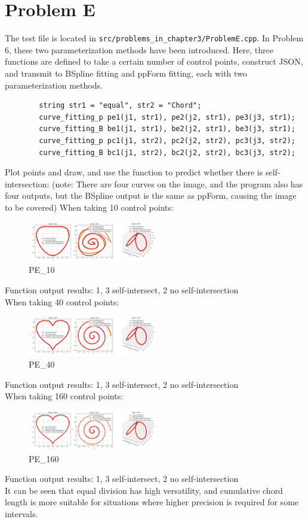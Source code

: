 \documentclass[a4paper]{article}
\begin{document}
\section*{Problem E}
    The test file is located in \texttt{src/problems\_in\_chapter3/ProblemE.cpp}.
    In Problem 6, these two parameterization methods have been introduced.
    Here, three functions are defined to take a certain number of control points, construct JSON, and transmit to BSpline fitting and ppForm fitting, each with two parameterization methods.
    \begin{verbatim}
        string str1 = "equal", str2 = "Chord";
        curve_fitting_p pe1(j1, str1), pe2(j2, str1), pe3(j3, str1);
        curve_fitting_B be1(j1, str1), be2(j2, str1), be3(j3, str1);
        curve_fitting_p pc1(j1, str2), pc2(j2, str2), pc3(j3, str2);
        curve_fitting_B bc1(j1, str2), bc2(j2, str2), bc3(j3, str2);
    \end{verbatim}
    Plot points and draw, and use the function to predict whether there is self-intersection:
    (note: There are four curves on the image, and the program also has four outputs, but the BSpline output is the same as ppForm, causing the image to be covered)
    When taking 10 control points:
    \begin{figure}[H] 
        \centering
        \includegraphics[width=0.5\textwidth]{../figure/PE_10.png} 
        \caption{PE\_10} 
    \end{figure}
    Function output results:
    1, 3 self-intersect, 2 no self-intersection\\
    When taking 40 control points:
    \begin{figure}[H] 
        \centering
        \includegraphics[width=0.5\textwidth]{../figure/PE_40.png} 
        \caption{PE\_40} 
    \end{figure}
    Function output results:
    1, 3 self-intersect, 2 no self-intersection\\
    When taking 160 control points:
    \begin{figure}[H] 
        \centering
        \includegraphics[width=0.5\textwidth]{../figure/PE_160.png} 
        \caption{PE\_160} 
    \end{figure}
    Function output results:
    1, 3 self-intersect, 2 no self-intersection\\
    It can be seen that equal division has high versatility, and cumulative chord length is more suitable for situations where higher precision is required for some intervals.
    
\end{document}
